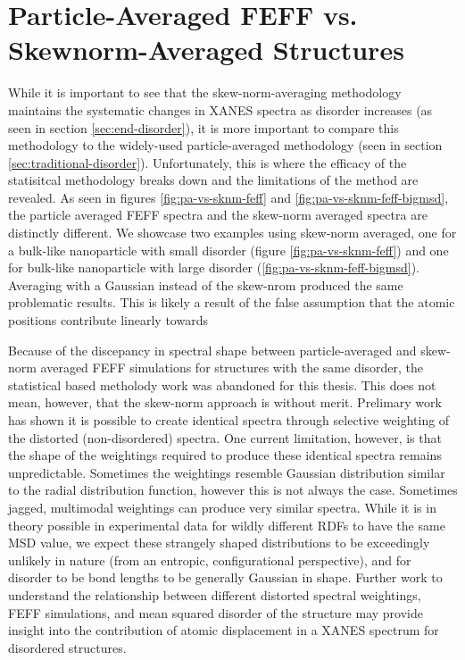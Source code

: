 \section{Particle-Averaged FEFF vs. Skewnorm-Averaged Structures} \label{sec:pa-feff-vs-gaussian-feff}

While it is important to see that the skew-norm-averaging methodology maintains the systematic changes in XANES spectra as disorder increases (as seen in section \ref{sec:end-disorder}), it is more important to compare this methodology to the widely-used particle-averaged methodology (seen in section \ref{sec:traditional-disorder}). Unfortunately, this is where the efficacy of the statisitcal methodology breaks down and the limitations of the method are revealed. As seen in figures \ref{fig:pa-vs-sknm-feff} and \ref{fig:pa-vs-sknm-feff-bigmsd}, the particle averaged FEFF spectra and the skew-norm averaged spectra are distinctly different. We showcase two examples using skew-norm averaged, one for a bulk-like nanoparticle with small disorder (figure \ref{fig:pa-vs-sknm-feff}) and one for bulk-like nanoparticle with large disorder (\ref{fig:pa-vs-sknm-feff-bigmsd}). Averaging with a Gaussian instead of the skew-nrom produced the same problematic results. This is likely a result of the false assumption that the atomic positions contribute linearly towards  

Because of the discepancy in spectral shape between particle-averaged and skew-norm averaged FEFF simulations for structures with the same disorder, the statistical based metholody work was abandoned for this thesis. This does not mean, however, that the skew-norm approach is without merit. Prelimary work has shown it is possible to create identical spectra through selective weighting of the distorted (non-disordered) spectra. One current limitation, however, is that the shape of the weightings required to produce these identical spectra remains unpredictable. Sometimes the weightings resemble Gaussian distribution similar to the radial distribution function, however this is not always the case. Sometimes jagged, multimodal weightings can produce very similar spectra. While it is in theory possible in experimental data for wildly different RDFs to have the same MSD value, we expect these strangely shaped distributions to be exceedingly unlikely in nature (from an entropic, configurational perspective), and for disorder to be bond lengths to be generally Gaussian in shape. Further work to understand the relationship between different distorted spectral weightings, FEFF simulations, and mean squared disorder of the structure may provide insight into the contribution of atomic displacement in a XANES spectrum for disordered structures.

